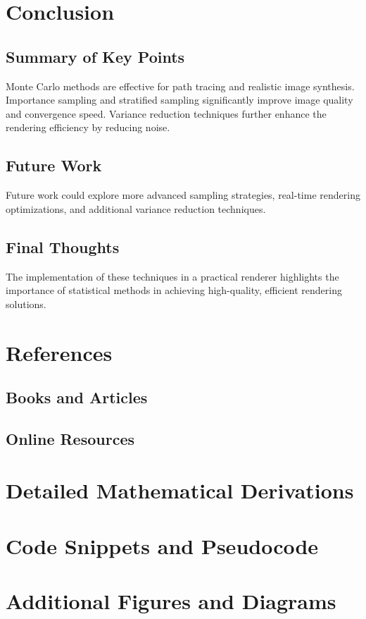 \documentclass[12pt]{article}
\begin{document}
\section{Conclusion}
\label{sec:conclusion}
\subsection{Summary of Key Points}
Monte Carlo methods are effective for path tracing and realistic image synthesis. Importance sampling and stratified sampling significantly improve image quality and convergence speed. Variance reduction techniques further enhance the rendering efficiency by reducing noise.
\subsection{Future Work}
Future work could explore more advanced sampling strategies, real-time rendering optimizations, and additional variance reduction techniques.
\subsection{Final Thoughts}
The implementation of these techniques in a practical renderer highlights the importance of statistical methods in achieving high-quality, efficient rendering solutions.

\section{References}
\label{sec:references}
\subsection{Books and Articles}


\subsection{Online Resources}

\appendix
\section{Detailed Mathematical Derivations}
\label{sec:appendix-derivations}

\section{Code Snippets and Pseudocode}
\label{sec:appendix-code}

\section{Additional Figures and Diagrams}
\label{sec:appendix-figures}
\end{document}
